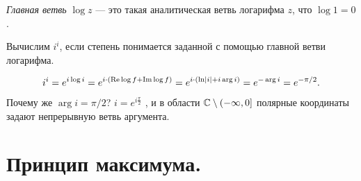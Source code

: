 \documentclass[../../main.tex]{subfiles}
\begin{document}
\begin{df}
 \textit{Главная ветвь} $ \log z $ --- это такая аналитическая ветвь логарифма $ z $, что $ \log 1 = 0 $.
\end{df}
\begin{exmpl}
 Вычислим $ i^{i} $, если степень понимается заданной с помощью главной ветви логарифма.

\begin{align*}
 i^{i} = e^{i \log i} = e^{i \cdot \left( \operatorname{Re} \log f + \operatorname{Im} \log f \right)} = e^{i \cdot \left( \ln \left| i \right| + i \arg i \right)} = e^{-\arg i} = e^{-\pi / 2}.
\end{align*} Почему же $ \arg i = \pi / 2 $?  $ i = e^{i \frac{\pi}{2}} $ , и в области $ \mathbb{C} \setminus \left(-\infty, 0\right]   $  полярные координаты задают непрерывную ветвь аргумента. 
\end{exmpl}

\newpage
\section{Принцип максимума.}
\end{document}
